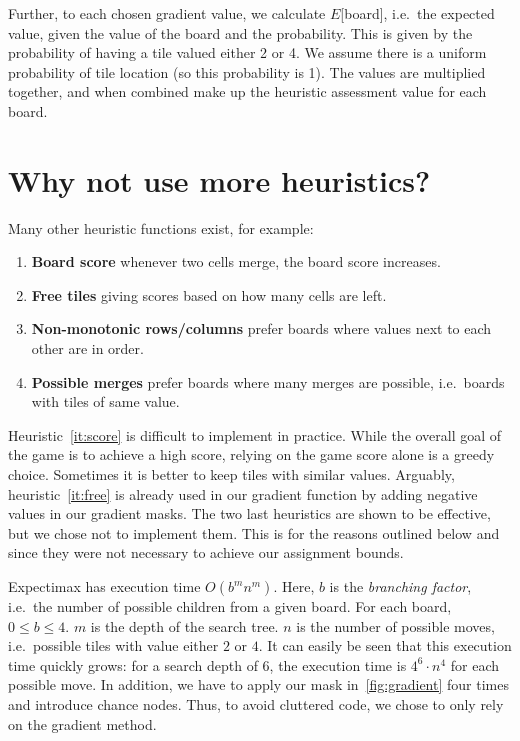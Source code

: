 \documentclass[journal]{IEEEtran}
\begin{document}
Further, to each chosen gradient value, we calculate $E$[board], i.e.\ the
expected value, given the value of the board and the probability. This
is given by the probability of having a tile valued either 2 or 4. We assume
there is a uniform probability of tile location (so this probability is 1).
The values are multiplied together, and when combined make up 
the heuristic assessment value for each board.

\section*{Why not use more heuristics?}

Many other heuristic functions exist, for example:
\begin{enumerate}
    \item\label{it:score} \textbf{Board score} \textendash{} whenever two cells merge, the board score increases.
    \item\label{it:free} \textbf{Free tiles} \textendash{} giving scores based on how many cells are left.
    \item\label{it:nonmono} \textbf{Non-monotonic rows/columns} \textendash{}
        prefer boards where values next to each other are in order.
    \item\label{it:merges} \textbf{Possible merges} \textendash{} prefer boards
        where many merges are possible, i.e.\ boards with tiles of same value.
\end{enumerate}

Heuristic~\ref{it:score} is difficult to implement in practice. While the overall
goal of the game is to achieve a high score, relying on the game score alone
is a greedy choice. Sometimes it is better to keep tiles with similar values.
Arguably, heuristic~\ref{it:free} is already used in our gradient
function by adding negative values in our gradient masks. The two last
heuristics are shown to be effective, but we chose not to implement them. This
is for the reasons outlined below and since they were not necessary to achieve
our assignment bounds.

Expectimax has execution time $O(b^{m}n^{m})$. Here, $b$ is the \textit{branching factor},
i.e.\ the number of possible children from a given board. For each board, $0
\leq b \leq 4$.  $m$ is the depth of the search tree. $n$ is the number of possible
moves, i.e.\ possible tiles with value either $2$ or $4$. It can easily be seen
that this execution time quickly grows: for a search depth of 6, the execution
time is $4^{6}\cdot{n^{4}}$ for each possible move. In addition, we have to apply our mask
in~\autoref{fig:gradient} four times and introduce chance nodes. Thus, to
avoid cluttered code, we chose to only rely on the gradient
method. 
\end{document}
